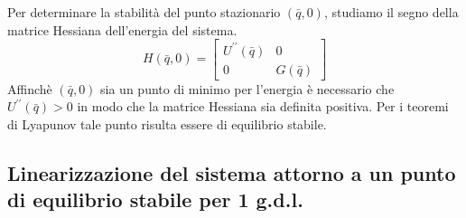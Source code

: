  \noindent Per determinare la stabilit\`{a} del punto stazionario $(\bar{q},0)$, studiamo il segno della matrice Hessiana dell'energia del sistema.
 \begin{equation}
H(\bar{q}, 0)=\left[\begin{array}{cc}
U^{\prime \prime}(\bar{q}) & 0 \\
0 & G(\bar{q})
\end{array}\right]
\end{equation}
Affinch\`{e} $(\bar{q},0)$ sia un punto di minimo per l'energia \`{e} necessario che $U^{\prime\prime}(\bar{q}) > 0 $ in modo che la matrice Hessiana sia definita positiva. Per i teoremi di Lyapunov tale punto risulta essere di equilibrio stabile.

\subsection{Linearizzazione del sistema attorno a un punto di equilibrio stabile per 1 g.d.l.}

